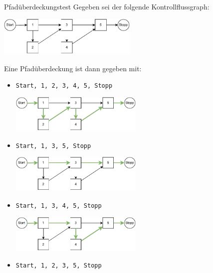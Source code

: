 \begin{example}{Pfadüberdeckungstest}
    Gegeben sei der folgende Kontrollflussgraph:
    \begin{center}
        \includegraphics[width=0.5\textwidth]{includes/figures/example_kontrollfluss_base.pdf}
    \end{center}

    Eine Pfadüberdeckung ist dann gegeben mit:
    \begin{itemize}
        \item \texttt{Start, 1, 2, 3, 4, 5, Stopp}

              \vspace{1em}
              \begin{center}
                  \includegraphics[width=0.5\textwidth]{includes/figures/example_kontrollfluss_pfad_1.pdf}
              \end{center}
        \item \texttt{Start, 1, 3, 5, Stopp}

              \vspace{1em}
              \begin{center}
                  \includegraphics[width=0.5\textwidth]{includes/figures/example_kontrollfluss_pfad_2.pdf}
              \end{center}
        \item \texttt{Start, 1, 3, 4, 5, Stopp}

              \vspace{1em}
              \begin{center}
                  \includegraphics[width=0.5\textwidth]{includes/figures/example_kontrollfluss_pfad_3.pdf}
              \end{center}
        \item \texttt{Start, 1, 2, 3, 5, Stopp}


\end{itemize}
\end{example}
